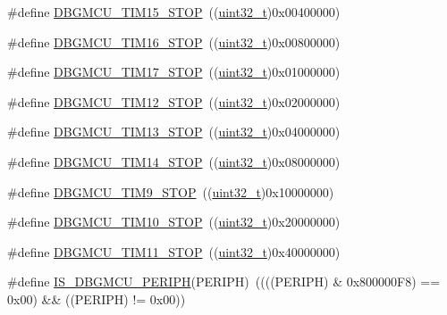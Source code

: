 \begin{DoxyCompactItemize}
\item 
\#define \hyperlink{group___d_b_g_m_c_u___exported___constants_ga68f2b4e7feb0a1f1e4b437a104c30f03}{D\+B\+G\+M\+C\+U\+\_\+\+T\+I\+M15\+\_\+\+S\+T\+OP}~((\hyperlink{_p_e___types_8h_a33594304e786b158f3fb30289278f5af}{uint32\+\_\+t})0x00400000)
\item 
\#define \hyperlink{group___d_b_g_m_c_u___exported___constants_ga8a0698403a9c76115bc607ee0149193f}{D\+B\+G\+M\+C\+U\+\_\+\+T\+I\+M16\+\_\+\+S\+T\+OP}~((\hyperlink{_p_e___types_8h_a33594304e786b158f3fb30289278f5af}{uint32\+\_\+t})0x00800000)
\item 
\#define \hyperlink{group___d_b_g_m_c_u___exported___constants_gabf3a93a60431c892bdf36ff02081badc}{D\+B\+G\+M\+C\+U\+\_\+\+T\+I\+M17\+\_\+\+S\+T\+OP}~((\hyperlink{_p_e___types_8h_a33594304e786b158f3fb30289278f5af}{uint32\+\_\+t})0x01000000)
\item 
\#define \hyperlink{group___d_b_g_m_c_u___exported___constants_ga4814287cef24f57e795b0f5b0174b49c}{D\+B\+G\+M\+C\+U\+\_\+\+T\+I\+M12\+\_\+\+S\+T\+OP}~((\hyperlink{_p_e___types_8h_a33594304e786b158f3fb30289278f5af}{uint32\+\_\+t})0x02000000)
\item 
\#define \hyperlink{group___d_b_g_m_c_u___exported___constants_gae0dd8a28977b261b013fa1ecda79b289}{D\+B\+G\+M\+C\+U\+\_\+\+T\+I\+M13\+\_\+\+S\+T\+OP}~((\hyperlink{_p_e___types_8h_a33594304e786b158f3fb30289278f5af}{uint32\+\_\+t})0x04000000)
\item 
\#define \hyperlink{group___d_b_g_m_c_u___exported___constants_ga731f63d66045abee68dbc634070df051}{D\+B\+G\+M\+C\+U\+\_\+\+T\+I\+M14\+\_\+\+S\+T\+OP}~((\hyperlink{_p_e___types_8h_a33594304e786b158f3fb30289278f5af}{uint32\+\_\+t})0x08000000)
\item 
\#define \hyperlink{group___d_b_g_m_c_u___exported___constants_ga560c557a0d0839dba04f7f2b47851109}{D\+B\+G\+M\+C\+U\+\_\+\+T\+I\+M9\+\_\+\+S\+T\+OP}~((\hyperlink{_p_e___types_8h_a33594304e786b158f3fb30289278f5af}{uint32\+\_\+t})0x10000000)
\item 
\#define \hyperlink{group___d_b_g_m_c_u___exported___constants_ga1f0ae2f78e1f9d7eb819bf49b13b5327}{D\+B\+G\+M\+C\+U\+\_\+\+T\+I\+M10\+\_\+\+S\+T\+OP}~((\hyperlink{_p_e___types_8h_a33594304e786b158f3fb30289278f5af}{uint32\+\_\+t})0x20000000)
\item 
\#define \hyperlink{group___d_b_g_m_c_u___exported___constants_gade03e5368c3bf8a2f43fc046f1d87f30}{D\+B\+G\+M\+C\+U\+\_\+\+T\+I\+M11\+\_\+\+S\+T\+OP}~((\hyperlink{_p_e___types_8h_a33594304e786b158f3fb30289278f5af}{uint32\+\_\+t})0x40000000)
\item 
\#define \hyperlink{group___d_b_g_m_c_u___exported___constants_ga96d44dc7861b6a3f364942704f323a45}{I\+S\+\_\+\+D\+B\+G\+M\+C\+U\+\_\+\+P\+E\+R\+I\+PH}(P\+E\+R\+I\+PH)~((((P\+E\+R\+I\+PH) \& 0x800000\+F8) == 0x00) \&\& ((\+P\+E\+R\+I\+P\+H) != 0x00))
\end{DoxyCompactItemize}


